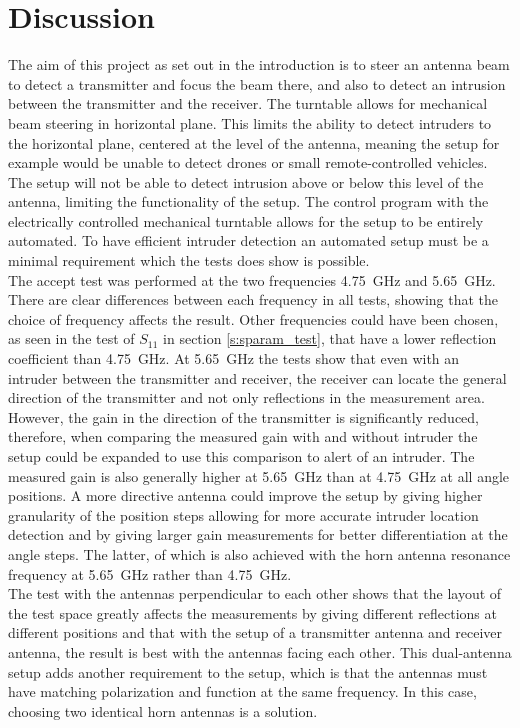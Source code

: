 \chapter{Discussion}
The aim of this project as set out in the introduction is to steer an antenna beam to detect a transmitter and focus the beam there, and also to detect an intrusion between the transmitter and the receiver. The turntable allows for mechanical beam steering in horizontal plane. This limits the ability to detect intruders to the horizontal plane, centered at the level of the antenna, meaning the setup for example would be unable to detect drones or small remote-controlled vehicles. The setup will not be able to detect intrusion above or below this level of the antenna, limiting the functionality of the setup. The control program with the electrically controlled mechanical turntable allows for the setup to be entirely automated. To have efficient intruder detection an automated setup must be a minimal requirement which the tests does show is possible.
\\[12pt]
The accept test was performed at the two frequencies \SI{4.75}{\giga\hertz} and \SI{5.65}{\giga\hertz}. There are clear differences between each frequency in all tests, showing that the choice of frequency affects the result. Other frequencies could have been chosen, as seen in the test of $S_{11}$ in section \ref{s:sparam_test}, that have a lower reflection coefficient than \SI{4.75}{\giga\hertz}. At \SI{5.65}{\giga\hertz} the tests show that even with an intruder between the transmitter and receiver, the receiver can locate the general direction of the transmitter and not only reflections in the measurement area. However, the gain in the direction of the transmitter is significantly reduced, therefore, when comparing the measured gain with and without intruder the setup could be expanded to use this comparison to alert of an intruder. The measured gain is also generally higher at \SI{5.65}{\giga\hertz} than at \SI{4.75}{\giga\hertz} at all angle positions. A more directive antenna could improve the setup by giving higher granularity of the position steps allowing for more accurate intruder location detection and by giving larger gain measurements for better differentiation at the angle steps. The latter, of which is also achieved with the horn antenna resonance frequency at \SI{5.65}{\giga\hertz} rather than \SI{4.75}{\giga\hertz}.
\\[12pt]
The test with the antennas perpendicular to each other shows that the layout of the test space greatly affects the measurements by giving different reflections at different positions and that with the setup of a transmitter antenna and receiver antenna, the result is best with the antennas facing each other. This dual-antenna setup adds another requirement to the setup, which is that the antennas must have matching polarization and function at the same frequency. In this case, choosing two identical horn antennas is a solution. 
